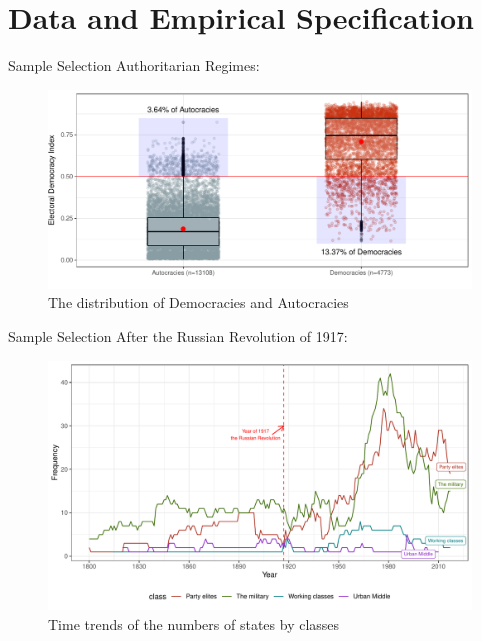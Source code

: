 \documentclass{Bredelebeamer}
\begin{document}
\section{Data and Empirical Specification}
\begin{frame}{Sample Selection}
Authoritarian Regimes: \centering 
\begin{figure}[!htbt]
	\centering
	\includegraphics[width=0.85\linewidth]{"../3. Datasets_Codebooks/Figures/Plot1"}
	\caption{The distribution of Democracies and Autocracies}
	\label{fig:plot1}
\end{figure}
\end{frame}	

\begin{frame}{Sample Selection}
After the Russian Revolution of 1917: \centering 
\begin{figure}[!htbt]
	\centering
	\includegraphics[width=0.9\linewidth]{"../3. Datasets_Codebooks/Figures/Plot3"}
	\caption{Time trends of the numbers of states by classes}
	\label{fig:plot2}
\end{figure}
\end{frame}
\end{document}
